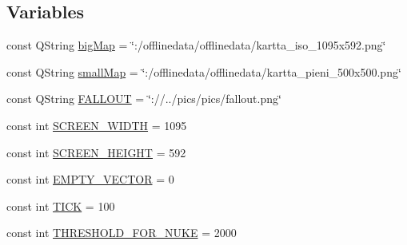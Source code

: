 \subsection*{Variables}
\begin{DoxyCompactItemize}
\item 
const Q\-String \hyperlink{gameengine_8hh_ad6494001dd20d6bedc7543fec6c695ba}{big\-Map} = \char`\"{}\-:/offlinedata/offlinedata/kartta\-\_\-iso\-\_\-1095x592.\-png\char`\"{}
\item 
const Q\-String \hyperlink{gameengine_8hh_af60fadacdd8d88e839ee0eae05d28518}{small\-Map} = \char`\"{}\-:/offlinedata/offlinedata/kartta\-\_\-pieni\-\_\-500x500.\-png\char`\"{}
\item 
const Q\-String \hyperlink{gameengine_8hh_aa00341459be5e91d4cfc88f9c6e60e1b}{F\-A\-L\-L\-O\-U\-T} = \char`\"{}\-://../pics/pics/fallout.\-png\char`\"{}
\item 
const int \hyperlink{gameengine_8hh_a3482785bd2a4c8b307f9e0b6f54e2c36}{S\-C\-R\-E\-E\-N\-\_\-\-W\-I\-D\-T\-H} = 1095
\item 
const int \hyperlink{gameengine_8hh_ab454541ae58bcf6555e8d723b1eb95e7}{S\-C\-R\-E\-E\-N\-\_\-\-H\-E\-I\-G\-H\-T} = 592
\item 
const int \hyperlink{gameengine_8hh_a8d5e08c7b38927d44080edc754c38548}{E\-M\-P\-T\-Y\-\_\-\-V\-E\-C\-T\-O\-R} = 0
\item 
const int \hyperlink{gameengine_8hh_ab6b394d83c83a373aef9084d78deb314}{T\-I\-C\-K} = 100
\item 
const int \hyperlink{gameengine_8hh_a0b1f44cc2ab8edc40a025d70653b110f}{T\-H\-R\-E\-S\-H\-O\-L\-D\-\_\-\-F\-O\-R\-\_\-\-N\-U\-K\-E} = 2000
\end{DoxyCompactItemize}


